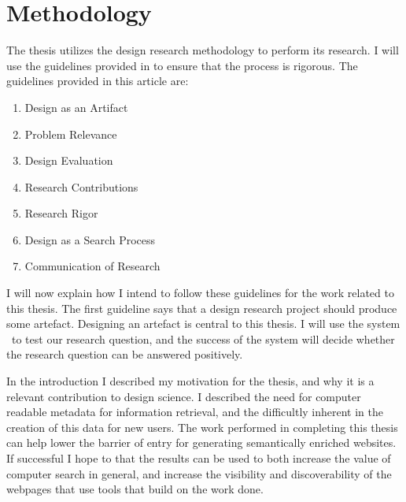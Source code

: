 
\chapter{Methodology} %

\label{Methodology} %


The thesis utilizes the design research methodology to perform its research.
I will use the guidelines provided in \citet{Hevner2004} to ensure that the process is rigorous.
The guidelines provided in this article are:
\begin{enumerate}
	\item \label{gl1}Design as an Artifact
	\item \label{gl2}Problem Relevance
	\item \label{gl3}Design Evaluation
	\item \label{gl4}Research Contributions
	\item \label{gl5}Research Rigor
	\item \label{gl6}Design as a Search Process
	\item \label{gl7}Communication of Research
\end{enumerate}

I will now explain how I intend to follow these guidelines for the work related to this thesis.
The first guideline says that a design research project should produce some artefact.
Designing an artefact is central to this thesis.
I will use the system \theartefact\ to test our research question,
and the success of the system will decide whether the research question can be answered positively.

In the introduction I described my motivation for the thesis, and why it is a relevant contribution to design science.
I described the need for computer readable metadata for information retrieval,
and the difficultly inherent in the creation of this data for new users.
The work performed in completing this thesis can help lower the barrier of entry for generating semantically enriched websites.
If successful I hope to that the results can be used to both increase the value of computer search in general,
and increase the visibility and discoverability of the webpages that use tools that build on the work done.

